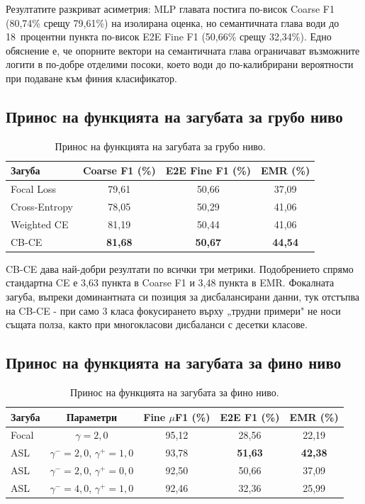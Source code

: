 \documentclass[12pt,a4paper]{report}
\begin{document}
Резултатите разкриват асиметрия: MLP главата постига по-висок Coarse F1 (80,74\% срещу 79,61\%) на изолирана оценка, но семантичната глава води до 18~процентни пункта по-висок E2E Fine F1 (50,66\% срещу 32,34\%). Едно обяснение е, че опорните вектори на семантичната глава ограничават възможните логити в по-добре отделими посоки, което води до по-калибрирани вероятности при подаване към финия класификатор.

\subsection{Принос на функцията на загубата за грубо ниво}
\label{sec:ablation_coarse_loss}

\begin{table}[H]
\centering
\caption{Принос на функцията на загубата за грубо ниво.}
\label{tab:ablation_coarse_loss}
\begin{tabular}{lccc}
\toprule
\textbf{Загуба} & \textbf{Coarse F1 (\%)} & \textbf{E2E Fine F1 (\%)} & \textbf{EMR (\%)} \\
\midrule
Focal Loss & 79,61 & 50,66 & 37,09 \\
Cross-Entropy & 78,05 & 50,29 & 41,06 \\
Weighted CE & 81,19 & 50,44 & 41,06 \\
CB-CE & \textbf{81,68} & \textbf{50,67} & \textbf{44,54} \\
\bottomrule
\end{tabular}
\end{table}

CB-CE дава най-добри резултати по всички три метрики. Подобрението спрямо стандартна CE е 3,63 пункта в Coarse F1 и 3,48 пункта в EMR. Фокалната загуба, въпреки доминантната си позиция за дисбалансирани данни, тук отстъпва на CB-CE - при само 3 класа фокусирането върху „трудни примери" не носи същата полза, както при многокласови дисбаланси с десетки класове.

\subsection{Принос на функцията на загубата за фино ниво}
\label{sec:ablation_fine_loss}

\begin{table}[H]
\centering
\caption{Принос на функцията на загубата за фино ниво.}
\label{tab:ablation_fine_loss}
\begin{tabular}{lcccc}
\toprule
\textbf{Загуба} & \textbf{Параметри} & \textbf{Fine $\mu$F1 (\%)} & \textbf{E2E F1 (\%)} & \textbf{EMR (\%)} \\
\midrule
Focal & $\gamma=2{,}0$ & 95,12 & 28,56 & 22,19 \\
ASL & $\gamma^-=2{,}0$, $\gamma^+=1{,}0$ & 93,78 & \textbf{51,63} & \textbf{42,38} \\
ASL & $\gamma^-=2{,}0$, $\gamma^+=0{,}0$ & 92,50 & 50,66 & 37,09 \\
ASL & $\gamma^-=4{,}0$, $\gamma^+=1{,}0$ & 92,46 & 32,36 & 25,99 \\
\bottomrule
\end{tabular}
\end{table}
\end{document}
